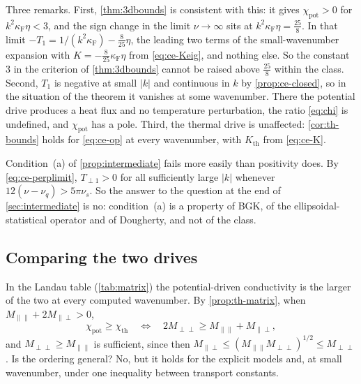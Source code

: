 \documentclass[11pt]{article}
\newcommand{\F}{\kappa_{\mathrm F}}
\newcommand{\thr}{\mathrm{th}}
\newcommand{\pot}{\mathrm{pot}}
\theoremstyle{definition}
\theoremstyle{remark}
\numberwithin{equation}{section}
\begin{document}
Three remarks. First, \cref{thm:3dbounds} is consistent with this: it
gives $\chi_\pot>0$ for $k^2\F\eta<3$, and the sign change in the limit
$\nu\to\infty$ sits at $k^2\F\eta=\tfrac{25}8$. In that limit
$-T_1=1/(k^2\F)-\tfrac8{25}\eta$, the leading two terms of the
small-wavenumber expansion with $K=-\tfrac8{25}\F\eta$ from
\eqref{eq:ce-Keig}, and nothing else. So the constant $3$ in the criterion of \cref{thm:3dbounds} cannot be
raised above $\tfrac{25}8$ within the class. Second, $T_1$ is negative at small $|k|$ and
continuous in $k$ by \cref{prop:ce-closed}, so in the situation of the
theorem it vanishes at some wavenumber. There the potential drive
produces a heat flux and no temperature perturbation, the ratio
\eqref{eq:chi} is undefined, and $\chi_\pot$ has a pole. Third, the
thermal drive is unaffected: \cref{cor:th-bounds} holds for
\eqref{eq:ce-op} at every wavenumber, with $K_\thr$ from
\eqref{eq:ce-K}.

Condition~(a) of \cref{prop:intermediate} fails more easily than
positivity does. By \eqref{eq:ce-perplimit}, $T_{\perp1}>0$ for all
sufficiently large $|k|$ whenever $12(\nu-\nu_q)>5\pi\nu_s$. So the
answer to the question at the end of \cref{sec:intermediate} is no:
condition~(a) is a property of BGK, of the ellipsoidal-statistical
operator and of Dougherty, and not of the class.

\subsection{Comparing the two drives}\label{sec:ce-compare}

In the Landau table (\cref{tab:matrix}) the potential-driven
conductivity is the larger of the two at every computed wavenumber. By
\cref{prop:th-matrix}, when $M_{\parallel\parallel}+2M_{\parallel\perp}>0$,
\begin{equation}
 \chi_\pot\geq\chi_\thr\quad\Longleftrightarrow\quad
 2M_{\perp\perp}\geq M_{\parallel\parallel}+M_{\parallel\perp},
 \label{eq:ce-compare}
\end{equation}
and $M_{\perp\perp}\geq M_{\parallel\parallel}$ is sufficient, since then
$M_{\parallel\perp}\leq(M_{\parallel\parallel}M_{\perp\perp})^{1/2}
\leq M_{\perp\perp}$. Is the ordering general? No, but it holds for the
explicit models and, at small wavenumber, under one inequality between
transport constants.
\end{document}
